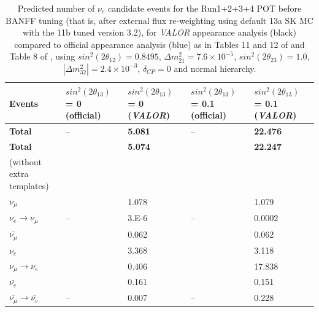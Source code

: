 \begin{table}[htbp]
\center
\begin{tabular} {|p{2cm}|p{2.5cm}|p{2.5cm}||p{2.5cm}|p{2.5cm}|}
\hline
Events  & $sin^{2}(2\theta_{13})$ = 0 (official) & $sin^{2}(2\theta_{13})$ = 0  ({\em VALOR}) & $sin^{2}(2\theta_{13})$ = 0.1 (official) & $sin^{2}(2\theta_{13})$ = 0.1 ({\em VALOR}) \\
\hline \hline
\textbf{Total}  & -- &\textbf{ 5.081} & -- & \textbf{22.476}  \\
\hline
\textbf{Total}  & \textbf{\color{blue}{5.07}} &\textbf{ 5.074} & \textbf{\color{blue}{22.26}} & \textbf{22.247}  \\
(without extra templates) & & & & \\
\hline
$\nu_{\mu}$  & \color{blue}{1.08}  & 1.078 & \color{blue}{1.09}  & 1.079   \\
\hline
$\nu_{e}\rightarrow\nu_{\mu}$  & -- & 3.E-6 & -- & 0.0002   \\
\hline
$\bar{\nu_{\mu}}$  & \color{blue}{0.06} & 0.062 & \color{blue}{0.06}  & 0.062 \\
\hline
$\nu_{e}$  & \color{blue}{3.37} & 3.368 & \color{blue}{3.12} & 3.118 \\
\hline
 $\nu_{\mu} \rightarrow \nu_{e}$ & \color{blue}{0.41} & 0.406 & \color{blue}{17.85} & 17.838 \\
\hline
$\bar{\nu_{e}}$  & \color{blue}{0.16} & 0.161 & \color{blue}{0.15} & 0.151 \\
\hline
$\bar{\nu_{\mu}} \rightarrow\bar{\nu_{e}}$  & -- & 0.007 & -- & 0.228 \\
\hline
\end{tabular}
\caption{Predicted number of $\nu_{e}$ candidate events for the Run1+2+3+4 POT before BANFF tuning (that is, after external flux re-weighting using default 13a SK MC with the 11b tuned version 3.2), for {\em VALOR} appearance 
analysis (black) compared to official appearance analysis (blue) as in Tables 11 and 12 of \cite{2013nueptheta} and Table 8 of \cite{2013nuenergy}, 
using $sin^{2}(2\theta_{12}) = 0.8495$, $\Delta m_{21}^{2} = 7.6 \times 10^{-5}$, 
$sin^{2}(2\theta_{23}) =  1.0$, $|\Delta m_{32}^{2}| = 2.4 \times 10^{-3}$, $\delta_{CP} = 0$ and normal hierarchy.}
\label{tab:nuepredictednominal}
\end{table}

